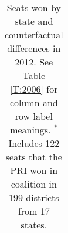 \documentclass[letter,12pt]{article}
\begin{document}
\begin{table}
\begin{center}
\begin{tabular}{rrrr|rrr|rrr|rrr}
\end{tabular}
\caption{Seats won by state and counterfactual differences in 2012. See Table \ref{T:2006} for column and row label meanings. $^*$Includes 122 seats that the PRI won in coalition in 199 districts from 17 states.}\label{T:2012}
\end{center}
\end{table}
\end{document}

